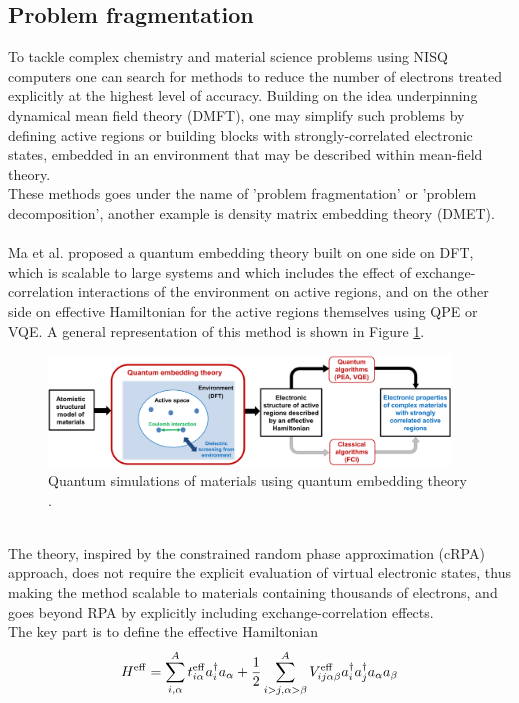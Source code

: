 \subsection{Problem fragmentation}
To tackle complex chemistry and material science problems using NISQ computers one can search for methods to reduce the number of electrons treated explicitly at the highest level of accuracy. Building on the idea underpinning dynamical mean field theory (DMFT), one may simplify such problems by defining active regions or building blocks with strongly-correlated electronic states, embedded in an environment that may be described within mean-field theory. \\
These methods goes under the name of 'problem fragmentation' or 'problem decomposition', another example is density matrix embedding theory (DMET). \\
\\
Ma et al. \cite{Ma2020Jul} proposed a quantum embedding theory built on one side on DFT, which is scalable to large systems and which includes the effect of exchange-correlation interactions of the environment on active regions, and on the other side on effective Hamiltonian for the active regions themselves using QPE or VQE. A general representation of this method is shown in Figure \ref{Quantum embedding theory}.
\begin{figure}[ht]
  \centering
  \includegraphics[width=0.95\textwidth]{figures/Quantum embedding theory.png}
  \caption{Quantum simulations of materials using quantum embedding theory \cite{Ma2020Jul}.} \label{Quantum embedding theory}
\end{figure} \\
The theory, inspired by the constrained random phase approximation (cRPA) approach, does not require the explicit evaluation of virtual electronic states, thus making the method scalable to materials containing thousands of electrons, and goes beyond RPA by explicitly including exchange-correlation effects. \\
The key part is to define the effective Hamiltonian
\begin{equation}
    H^{{\rm eff}} = \sum^A_{i,\alpha} t^{{\rm eff}}_{i\alpha} a^\dagger_i a_\alpha + \frac{1}{2} \sum^A_{i>j,\alpha>\beta} V^{{\rm eff}}_{ij\alpha\beta} a^\dagger_i a^\dagger_j a_\alpha a_\beta
\end{equation}
